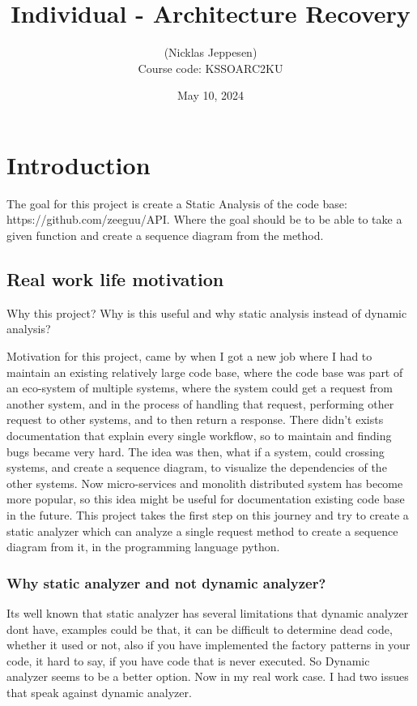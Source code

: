 \documentclass[12pt,a4paper]{report}
\title{Individual - Architecture Recovery}
\author{ (Nicklas Jeppesen) \\ Course code: KSSOARC2KU}
\date{May 10, 2024}
\begin{document}
	\maketitle
    \tableofcontents

    
    
    \chapter{Introduction}
    The goal for this project is create a Static Analysis of the code base: https://github.com/zeeguu/API. 
    Where the goal should be to be able to take a given function and create a sequence diagram from the method.


    \section{Real work life motivation}
    Why this project? Why is this useful and why static analysis instead of dynamic analysis? 
    
    Motivation for this project, came by when I got a new job where I had to maintain an existing relatively large code base, where the code base was part of an eco-system of multiple systems, where the system could get a request from another system, and in the process of handling that request, performing other request to other systems, and to then return a response. There didn’t exists documentation that explain every single workflow, so to maintain and finding bugs became very hard. The idea was then, what if a system, could crossing systems, and create a sequence diagram, to visualize the dependencies of the other systems. Now micro-services and monolith distributed system has become more popular, so this idea might be useful for documentation existing code base in the future. 
    This project takes the first step on this journey and try to create a static analyzer which can analyze a single request method to create a sequence diagram from it, in the programming language python.

    \subsection*{Why static analyzer and not dynamic analyzer?}
    Its well known that static analyzer has several limitations that dynamic analyzer dont have, examples could be that, it can be difficult to determine dead code, whether it used or not, also if you have implemented the factory patterns in your code, it hard to say, if you have code that is never executed. So Dynamic analyzer seems to be a better option. Now in my real work case. I had two issues that speak against dynamic analyzer.
\end{document}
